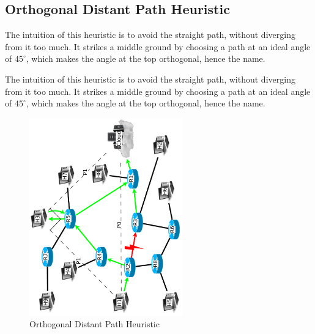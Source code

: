 \documentclass[conference]{IEEEtran}
\begin{document}
\subsection{Orthogonal Distant Path Heuristic}
The intuition of this heuristic is to avoid the straight path, without diverging from it too much.  It strikes a middle ground by choosing a path at an ideal angle of $45^{\circ}$, which makes the angle at the top orthogonal, hence the name.
\begin{algorithm}
\DontPrintSemicolon
{}
\SetAlgoLined
\SetAlgoLongEnd
\scriptsize
{}
\caption{The intuition of this heuristic is to avoid the straight path, without diverging from it too much.  It strikes a middle ground by choosing a path at an ideal angle of $45^{\circ}$, which makes the angle at the top orthogonal, hence the name.}
\small
\end{algorithm}

\begin{figure}[!H]
\centering
\includegraphics[width=2.6in,angle=-90]{../../images/diagrams/angular_path}
\caption{Orthogonal Distant Path Heuristic}
\end{figure}
%
%
\end{document}
